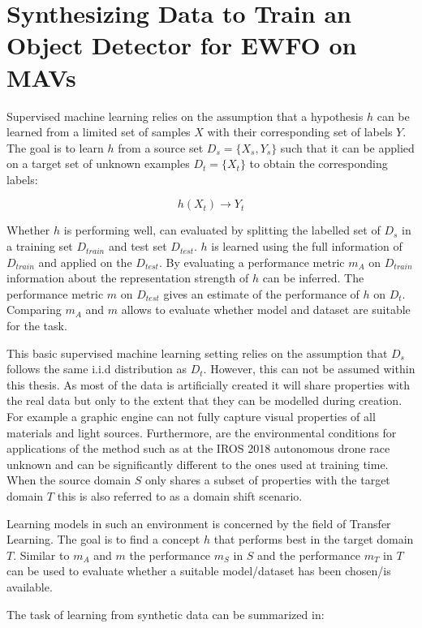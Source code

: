 \chapter{Synthesizing Data to Train an Object Detector for \ac{EWFO} on \acp{MAV}}
\label{sec:training}

Supervised machine learning relies on the assumption that a hypothesis $h$ can be learned from a limited set of samples $X$ with their corresponding set of labels $Y$. The goal is to learn $h$ from a source set $D_s = \{X_{s},Y_{s}\}$ such that it can be applied on a target set of unknown examples $D_t = \{X_{t}\}$ to obtain the corresponding labels:

$$
h(X_t)\rightarrow Y_t
$$ 

Whether $h$ is performing well, can evaluated by splitting the labelled set of $D_s$ in a training set $D_{train}$ and test set $D_{test}$. $h$ is learned using the full information of $D_{train}$ and applied on the $D_{test}$. By evaluating a performance metric $m_A$ on $D_{train}$ information about the representation strength of $h$ can be inferred. The performance metric $m$ on $D_{test}$ gives an estimate of the performance of $h$ on $D_t$. Comparing $m_A$ and $m$ allows to evaluate whether model and dataset are suitable for the task.
			
This basic supervised machine learning setting relies on the assumption that $D_s$ follows the same i.i.d distribution as $D_t$. However, this can not be assumed within this thesis. As most of the data is artificially created it will share properties with the real data but only to the extent that they can be modelled during creation. For example a graphic engine can not fully capture visual properties of all materials and light sources. Furthermore, are the environmental conditions for applications of the method such as at the IROS 2018 autonomous drone race unknown and can be significantly different to the ones used at training time. When the source domain $S$ only shares a subset of properties with the target domain $T$ this is also referred to as a domain shift scenario.

Learning models in such an environment is concerned by the field of Transfer Learning. The goal is to find a concept $h$ that performs best in the target domain $T$. Similar to $m_A$ and $m$ the performance $m_S$ in $S$ and the performance $m_T$ in $T$ can be used to evaluate whether a suitable model/dataset has been chosen/is available.

The task of learning from synthetic data can be summarized in:

